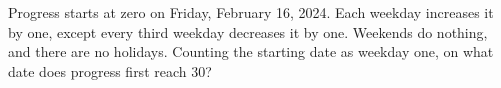 Progress starts at zero on Friday, February 16, 2024. Each weekday increases it by one, except every third weekday decreases it by one. Weekends do nothing, and there are no holidays. Counting the starting date as weekday one, on what date does progress first reach $30$?
